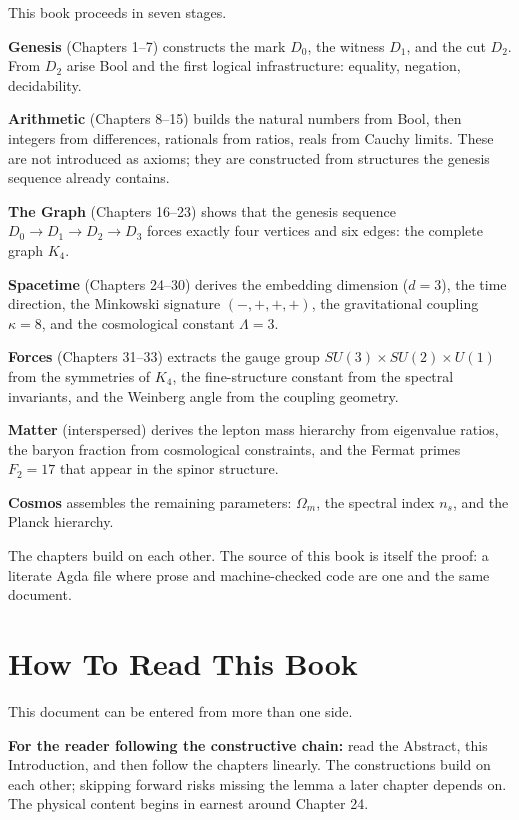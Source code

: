 \documentclass[11pt,a4paper]{book}
\begin{document}
This book proceeds in seven stages.

\textbf{Genesis} (Chapters 1--7) constructs the mark $D_0$, the witness $D_1$, and the cut $D_2$. From $D_2$ arise Bool and the first logical infrastructure: equality, negation, decidability.

\textbf{Arithmetic} (Chapters 8--15) builds the natural numbers from Bool, then integers from differences, rationals from ratios, reals from Cauchy limits. These are not introduced as axioms; they are constructed from structures the genesis sequence already contains.

\textbf{The Graph} (Chapters 16--23) shows that the genesis sequence $D_0 \to D_1 \to D_2 \to D_3$ forces exactly four vertices and six edges: the complete graph $K_4$.

\textbf{Spacetime} (Chapters 24--30) derives the embedding dimension ($d = 3$), the time direction, the Minkowski signature $(-,+,+,+)$, the gravitational coupling $\kappa = 8$, and the cosmological constant $\Lambda = 3$.

\textbf{Forces} (Chapters 31--33) extracts the gauge group $SU(3) \times SU(2) \times U(1)$ from the symmetries of $K_4$, the fine-structure constant from the spectral invariants, and the Weinberg angle from the coupling geometry.

\textbf{Matter} (interspersed) derives the lepton mass hierarchy from eigenvalue ratios, the baryon fraction from cosmological constraints, and the Fermat primes $F_2 = 17$ that appear in the spinor structure.

\textbf{Cosmos} assembles the remaining parameters: $\Omega_m$, the spectral index $n_s$, and the Planck hierarchy.

The chapters build on each other. The source of this book is itself the proof: a literate Agda file where prose and machine-checked code are one and the same document.

\section*{How To Read This Book}

This document can be entered from more than one side.

\textbf{For the reader following the constructive chain:} read the Abstract, this Introduction, and then follow the chapters linearly. The constructions build on each other; skipping forward risks missing the lemma a later chapter depends on. The physical content begins in earnest around Chapter 24.
\end{document}
